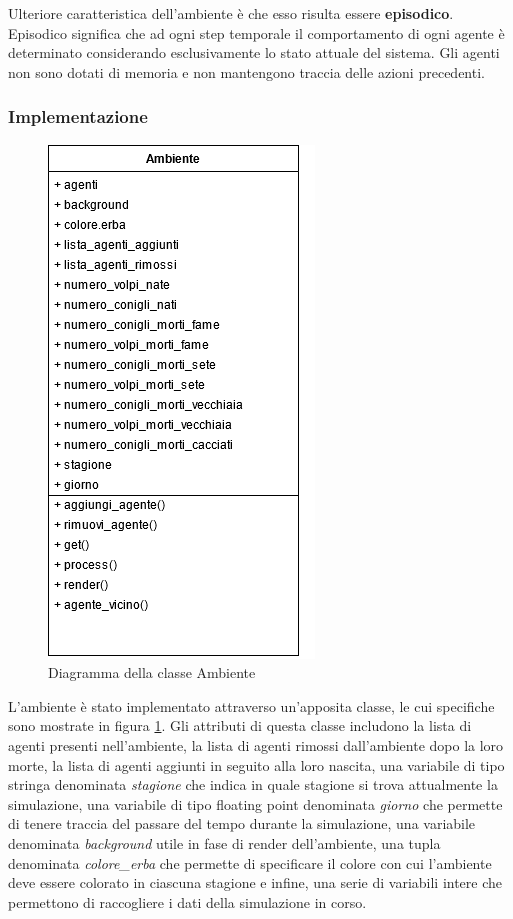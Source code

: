 \documentclass[11pt]{article}
\begin{document}
Ulteriore caratteristica dell'ambiente è che esso risulta essere \textbf{episodico}. Episodico significa che ad ogni step temporale il comportamento di ogni agente è determinato considerando esclusivamente lo stato attuale del sistema. Gli agenti non sono dotati di memoria e non  mantengono traccia delle azioni precedenti. 

\subsubsection{Implementazione}
\begin{figure}[h!]
     \centering
     \includegraphics[scale = 0.7]{Ambiente.png}
     \caption{Diagramma della classe Ambiente}
     \label{fig:ambienteUML}
\end{figure}

L'ambiente è stato implementato attraverso un'apposita classe, le cui specifiche sono mostrate in figura \ref{fig:ambienteUML}. Gli attributi di questa classe includono la lista di agenti presenti nell'ambiente, la lista di agenti rimossi dall'ambiente dopo la loro morte, la lista di agenti aggiunti in seguito alla loro nascita, una variabile di tipo stringa denominata \emph{stagione} che indica in quale stagione si trova attualmente la simulazione, una variabile di tipo floating point denominata \emph{giorno} che permette di tenere traccia del passare del tempo durante la simulazione, una variabile denominata \emph{background} utile in fase di render dell'ambiente, una tupla denominata \emph{colore\_erba} che permette di specificare il colore con cui l'ambiente deve essere colorato in ciascuna stagione e infine, una serie di variabili intere che permettono di raccogliere i dati della simulazione in corso.
\end{document}
